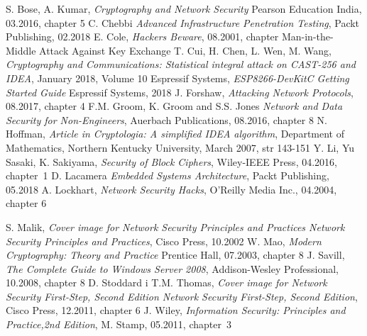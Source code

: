 \documentclass[12p]{article}
\begin{document}
\newpage
\begin{thebibliography}{99}
  S. Bose, A. Kumar,
\emph{Cryptography and Network Security}
Pearson Education India, 03.2016, chapter 5
 C. Chebbi
\emph{Advanced Infrastructure Penetration Testing},
Packt Publishing, 02.2018
 E. Cole,
\emph{Hackers Beware},
08.2001, chapter Man-in-the-Middle Attack Against Key Exchange
 T. Cui, H. Chen, L. Wen, M. Wang,
\emph{Cryptography and Communications: \mbox{Statistical} integral attack on CAST-256 and IDEA}, January 2018, Volume 10
Espressif Systems,
\emph{ESP8266-DevKitC Getting Started Guide}
Espressif Systems, 2018
 J. Forshaw,
\emph{
Attacking Network Protocols},
08.2017, chapter 4
 F.M. Groom, K. Groom and S.S. Jones
\emph{Network and Data Security for Non-Engineers},
\mbox{Auerbach} Publications, 08.2016, chapter 8
 N. Hoffman,
\emph{Article in Cryptologia: A simplified IDEA algorithm},
Department of Mathematics, Northern Kentucky University, March 2007, str 143-151
 Y. Li, Yu Sasaki, K. Sakiyama,
\emph{Security of Block Ciphers},
Wiley-IEEE Press, 04.2016, \mbox{chapter 1}
D. Lacamera
\emph{Embedded Systems Architecture},
Packt Publishing, 05.2018
 A. Lockhart,
\emph{Network Security Hacks},
O'Reilly Media Inc., 04.2004, chapter 6

 S. Malik,
\emph{Cover image for Network Security Principles and Practices
Network Security \mbox{Principles} and Practices},
Cisco Press, 10.2002
W. Mao,
\emph{Modern Cryptography: Theory and Practice}
Prentice Hall, 07.2003, chapter 8
 J. Savill,
\emph{The Complete Guide to Windows Server 2008},
Addison-Wesley Professional, 10.2008, chapter 8
 D. Stoddard i T.M. Thomas,
\emph{
Cover image for Network Security First-Step, Second Edition
Network Security First-Step, Second Edition},
Cisco Press, 12.2011, chapter 6
 J. Wiley,
\emph{Information Security: Principles and Practice,2nd Edition},
M. Stamp, 05.2011, \mbox{chapter 3}





\end{thebibliography}
\newpage
\listoffigures
{}
\end{document}
